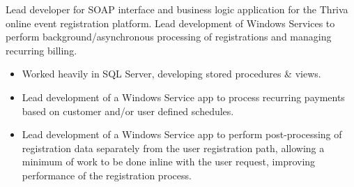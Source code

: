 \documentclass[11pt]{article}
\begin{document}
\begin{itemize}
		Lead developer for SOAP interface and business logic application for the Thriva online
		event registration platform. Lead development of Windows Services to perform
		background/asynchronous processing of registrations and managing recurring billing.

		\begin{itemize}
			\item Worked heavily in SQL Server, developing stored procedures \& views.
			\item Lead development of a Windows Service app to process recurring
			payments based on customer and/or user defined schedules.
			\item Lead development of a Windows Service app to perform post-processing
			of registration data separately from the user registration path, allowing
			a minimum of work to be done inline with the user request, improving
			performance of the registration process.
		\end{itemize}

\end{itemize}
\end{document}
